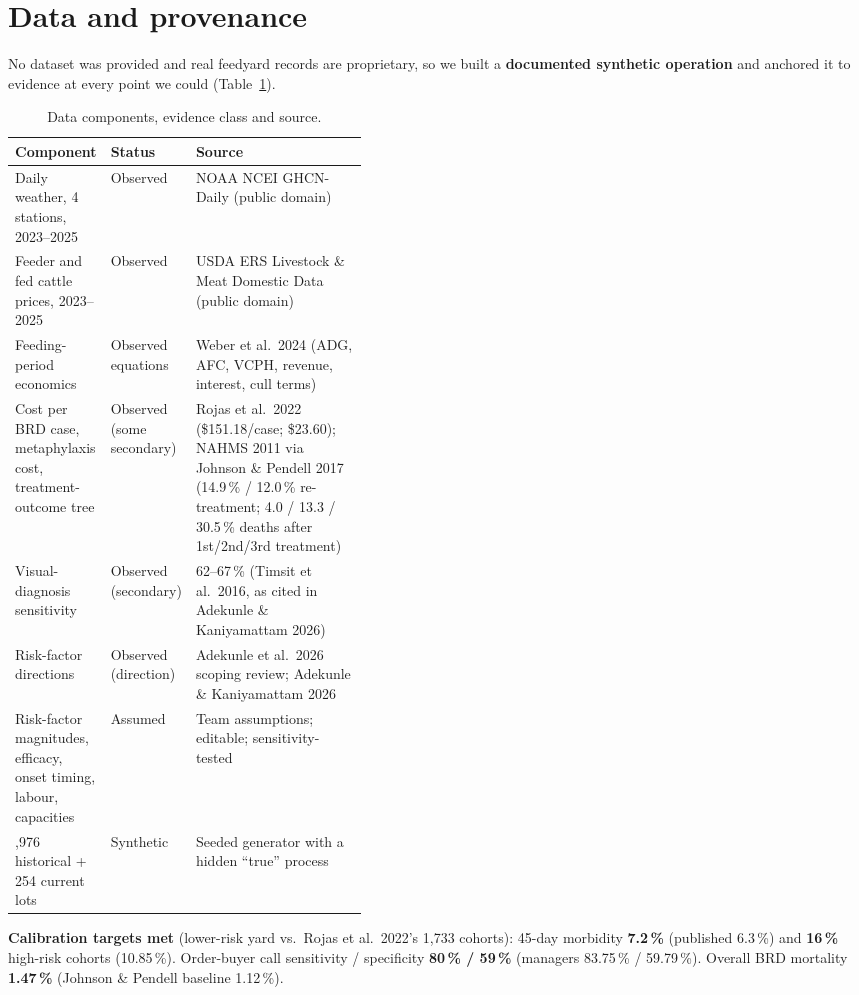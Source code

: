 \documentclass[10pt,letterpaper]{article}
\newcommand{\pct}{\,\%}
\newcommand{\usd}[1]{\$#1}
\newcommand{\lead}[1]{\textbf{#1}\enspace}
\begin{document}
\section{Data and provenance}

No dataset was provided and real feedyard records are proprietary, so we built a \textbf{documented synthetic operation} and anchored it to evidence at every point we could (Table~\ref{tab:prov}).

\begin{table}[h]
\centering\small
\caption{Data components, evidence class and source.}\label{tab:prov}
\begin{tabularx}{\linewidth}{@{}>{\raggedright\arraybackslash}p{0.27\linewidth} >{\raggedright\arraybackslash}p{0.14\linewidth} X@{}}
\toprule
\textbf{Component} & \textbf{Status} & \textbf{Source} \\
\midrule
Daily weather, 4 stations, 2023--2025 & Observed & NOAA NCEI GHCN-Daily (public domain) \\
Feeder and fed cattle prices, 2023--2025 & Observed & USDA ERS Livestock \& Meat Domestic Data (public domain) \\
Feeding-period economics & Observed equations & Weber et al.\ 2024 (ADG, AFC, VCPH, revenue, interest, cull terms) \\
Cost per BRD case, metaphylaxis cost, treatment-outcome tree & Observed (some secondary) & Rojas et al.\ 2022 (\usd{151.18}/case; \usd{23.60}); NAHMS 2011 via Johnson \& Pendell 2017 (14.9\pct{} / 12.0\pct{} re-treatment; 4.0 / 13.3 / 30.5\pct{} deaths after 1st/2nd/3rd treatment) \\
Visual-diagnosis sensitivity & Observed (secondary) & 62--67\pct{} (Timsit et al.\ 2016, as cited in Adekunle \& Kaniyamattam 2026) \\
Risk-factor directions & Observed (direction) & Adekunle et al.\ 2026 scoping review; Adekunle \& Kaniyamattam 2026 \\
Risk-factor magnitudes, efficacy, onset timing, labour, capacities & Assumed & Team assumptions; editable; sensitivity-tested \\
2,976 historical + 254 current lots & Synthetic & Seeded generator with a hidden ``true'' process \\
\bottomrule
\end{tabularx}
\end{table}

\lead{Calibration targets met} (lower-risk yard vs.\ Rojas et al.\ 2022's 1,733 cohorts): 45-day morbidity \textbf{7.2\pct} (published 6.3\pct) and \textbf{16\pct} high-risk cohorts (10.85\pct). Order-buyer call sensitivity / specificity \textbf{80\pct{} / 59\pct} (managers 83.75\pct{} / 59.79\pct). Overall BRD mortality \textbf{1.47\pct} (Johnson \& Pendell baseline 1.12\pct).
\end{document}
